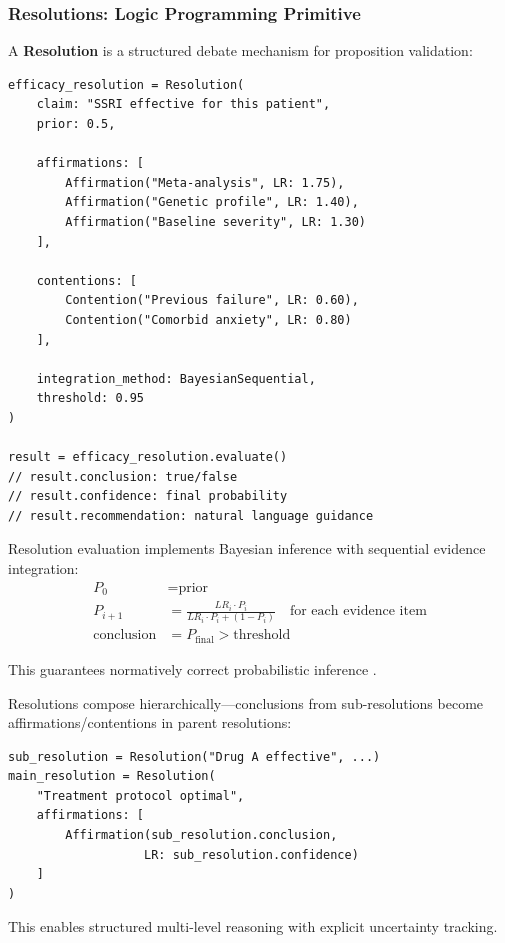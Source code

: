 \subsubsection{Resolutions: Logic Programming Primitive}

\begin{definition}
A \textbf{Resolution} is a structured debate mechanism for proposition validation:
\begin{verbatim}
efficacy_resolution = Resolution(
    claim: "SSRI effective for this patient",
    prior: 0.5,

    affirmations: [
        Affirmation("Meta-analysis", LR: 1.75),
        Affirmation("Genetic profile", LR: 1.40),
        Affirmation("Baseline severity", LR: 1.30)
    ],

    contentions: [
        Contention("Previous failure", LR: 0.60),
        Contention("Comorbid anxiety", LR: 0.80)
    ],

    integration_method: BayesianSequential,
    threshold: 0.95
)

result = efficacy_resolution.evaluate()
// result.conclusion: true/false
// result.confidence: final probability
// result.recommendation: natural language guidance
\end{verbatim}
\end{definition}

\begin{theorem}
\label{thm:resolution_semantics}
Resolution evaluation implements Bayesian inference with sequential evidence integration:
\begin{align}
P_0 &= \text{prior} \\
P_{i+1} &= \frac{LR_i \cdot P_i}{LR_i \cdot P_i + (1 - P_i)} \quad \text{for each evidence item} \\
\text{conclusion} &= P_{\text{final}} > \text{threshold}
\end{align}

This guarantees normatively correct probabilistic inference \cite{jaynes2003probability}.
\end{theorem}

\begin{proposition}
Resolutions compose hierarchically—conclusions from sub-resolutions become affirmations/contentions in parent resolutions:
\begin{verbatim}
sub_resolution = Resolution("Drug A effective", ...)
main_resolution = Resolution(
    "Treatment protocol optimal",
    affirmations: [
        Affirmation(sub_resolution.conclusion,
                   LR: sub_resolution.confidence)
    ]
)
\end{verbatim}

This enables structured multi-level reasoning with explicit uncertainty tracking.
\end{proposition}

